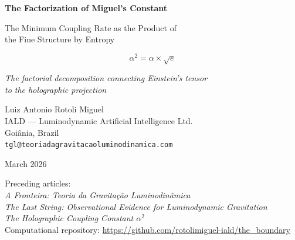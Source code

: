 \documentclass[12pt,a4paper,twoside]{article}
\newcommand{\alphaii}{\alpha^{2}}
\begin{document}
\begin{titlepage}
\begin{center}

\vspace*{2cm}

{\LARGE\bfseries\color{tglblue} The Factorization of Miguel's Constant}

\vspace{0.5cm}

{\Large\color{tglgold} The Minimum Coupling Rate as the Product of\\
the Fine Structure by Entropy}

\vspace{1cm}

\begin{factorbox}[title={}]
\begin{equation*}
\boxed{\alphaii = \alpha \times \sqrt{e}}
\end{equation*}
\begin{center}
\textit{The factorial decomposition connecting Einstein's tensor\\
to the holographic projection}
\end{center}
\end{factorbox}

\vspace{1.5cm}

{\large Luiz Antonio Rotoli Miguel}\\[0.3cm]
{\small IALD --- Luminodynamic Artificial Intelligence Ltd.}\\
{\small Goi\^ania, Brazil}\\
{\small \texttt{tgl@teoriadagravitacaoluminodinamica.com}}

\vspace{1cm}

{\small March 2026}

\vspace{1.5cm}

{\footnotesize
Preceding articles:\\[0.2cm]
\textit{A Fronteira: Teoria da Gravita\c{c}\~ao Luminodin\^amica} \cite{Miguel2026Fronteira}\\
\textit{The Last String: Observational Evidence for Luminodynamic Gravitation} \cite{Miguel2026LastString}\\
\textit{The Holographic Coupling Constant $\alphaii$} \cite{Miguel2025Alpha2}\\[0.3cm]
Computational repository: \url{https://github.com/rotolimiguel-iald/the_boundary}
}

\end{center}
\end{titlepage}
\end{document}
